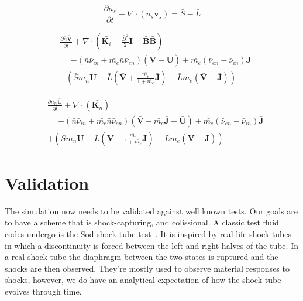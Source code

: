 \documentclass[12pt,upcase]{umlthesis}
\begin{document}
\begin{equation}\label{eq:normcontinuity}
	\frac{\partial \bar{n_s}}{\partial \bar{t}} + \nabla \cdot (\bar{n_s} \bar{\textbf{v}_s}) = \bar{S} - \bar{L}
\end{equation}

\begin{equation}\label{eq:normmomentumcom}
\begin{aligned}
	&\frac{\partial \bar{n} \bar{\textbf{V}}}{\partial \bar{t}} + \nabla \cdot (\bar{\textbf{K}_i} + \frac{\bar{B}^2}{2}\textbf{I} - \bar{\textbf{B}}\bar{\textbf{B}}) \\
	&= - (\bar{n} \bar{\nu}_{in} + \bar{m_e} \bar{n} \bar{\nu}_{en})(\bar{\textbf{V}} - \bar{\textbf{U}}) + \bar{m_e}(\bar{\nu}_{en}-\bar{\nu}_{in}) \bar{\textbf{J}}  \\
	&+ (\bar{S} \bar{m_n} \textbf{U} - \bar{L} (\bar{\textbf{V}}+ \frac{\bar{m_e}}{1+\bar{m_e}}\bar{\textbf{J}}) - \bar{L} \bar{m_e} (\bar{\textbf{V}} -\bar{\textbf{J}}) )
\end{aligned} 
\end{equation}

\begin{equation}\label{eq:normmomentumneutral}
\begin{aligned}
	&\frac{\partial \bar{n}_n \bar{\textbf{U}}}{\partial \bar{t}} + \nabla \cdot (\bar{\textbf{K}_n}) \\
	&= + (\bar{n} \bar{\nu}_{in} + \bar{m_e} \bar{n} \bar{\nu}_{en})(\bar{\textbf{V}} +\bar{m_e}\bar{\textbf{J}}  - \bar{\textbf{U}}) + \bar{m_e}(\bar{\nu}_{en}-\bar{\nu}_{in}) \bar{\textbf{J}}  \\
	&+ (\bar{S} \bar{m_n} \textbf{U} - \bar{L} (\bar{\textbf{V}}+ \frac{\bar{m_e}}{1+\bar{m_e}}\bar{\textbf{J}}) - \bar{L} \bar{m_e} (\bar{\textbf{V}} -\bar{\textbf{J}}) )
\end{aligned} 
\end{equation}

\section{Validation}

The simulation now needs to be validated against well known tests. Our goals are to have a scheme that is shock-capturing, and colissional. A classic test fluid codes undergo is the Sod shock tube test~\citep{Sod1978}. It is inspired by real life shock tubes in which a discontinuity is forced between the left and right halves of the tube. In a real shock tube the diaphragm between the two states is ruptured and the shocks are then observed. They're mostly used to observe material responses to shocks, however, we do have an analytical expectation of how the shock tube evolves through time.
\end{document}
